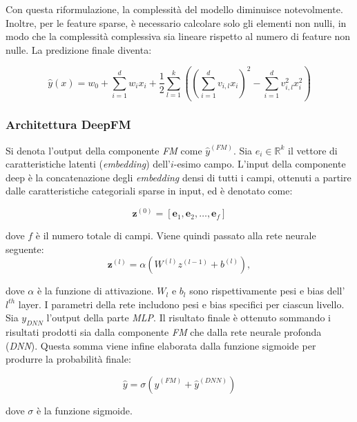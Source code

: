 Con questa riformulazione, la complessità del modello diminuisce notevolmente. Inoltre, per le feature sparse, è necessario calcolare solo gli elementi non nulli, in modo che la complessità complessiva sia lineare rispetto al numero di feature non nulle.
La predizione finale diventa:

\[
\hat{y}(x) = w_0 + \sum_{i=1}^d w_i x_i + \frac{1}{2} \sum_{l=1}^k \left( \left( \sum_{i=1}^d v_{i,l} x_i \right)^2 - \sum_{i=1}^d v_{i,l}^2 x_i^2 \right)
\]

\subsubsection{Architettura DeepFM}
Si denota l'output della componente \textit{FM} come $\hat{y}^{(FM)}$. Sia $e_i \in \mathbb{R}^{k}$ il vettore di caratteristiche latenti (\textit{embedding}) dell'$i$-esimo campo. L'input della componente deep è la concatenazione degli \textit{embedding} densi di tutti i campi, ottenuti a partire dalle caratteristiche categoriali sparse in input, ed è denotato come:

\[
\mathbf{z}^{(0)} = [\mathbf{e}_1, \mathbf{e}_2, \ldots, \mathbf{e}_f]
\]

dove $f$ è il numero totale di campi. Viene quindi passato alla rete neurale seguente:
\[
\mathbf{z}^{(l)}  = \alpha(W^{(l)}z^{(l-1)} + b^{(l)}),
\]

dove $\alpha$ è la funzione di attivazione. $W_l$ e $b_l$ sono rispettivamente pesi e bias dell'$l^{th}$ layer. I parametri della rete includono pesi e bias specifici per ciascun livello. Sia $y_{DNN}$ l'output della parte \textit{MLP}. Il risultato finale è ottenuto sommando i risultati prodotti sia dalla componente \textit{FM} che dalla rete neurale profonda (\textit{DNN}). Questa somma viene infine elaborata dalla funzione sigmoide per produrre la probabilità finale:

\[
\hat{y} = \sigma(\hat{y}^{(FM)} + \hat{y}^{(DNN)})
\]

dove $\sigma$ è la funzione sigmoide.

